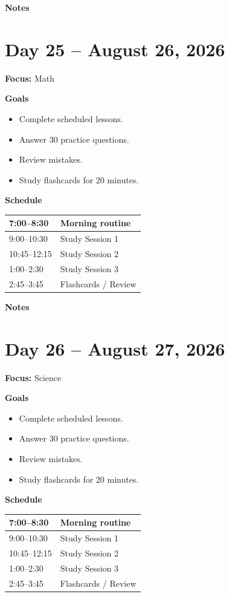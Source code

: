 \vspace{1em}
\textbf{Notes}

\vspace{8cm}

\newpage

\section*{Day 25 -- August 26, 2026}
\textbf{Focus:} Math

\textbf{Goals}
\begin{itemize}
\item Complete scheduled lessons.
\item Answer 30 practice questions.
\item Review mistakes.
\item Study flashcards for 20 minutes.
\end{itemize}

\textbf{Schedule}
\begin{tabular}{|p{4cm}|p{10cm}|}\hline
7:00--8:30 & Morning routine \\\hline
9:00--10:30 & Study Session 1 \\\hline
10:45--12:15 & Study Session 2 \\\hline
1:00--2:30 & Study Session 3 \\\hline
2:45--3:45 & Flashcards / Review \\\hline
\end{tabular}

\vspace{1em}
\textbf{Notes}

\vspace{8cm}

\newpage

\section*{Day 26 -- August 27, 2026}
\textbf{Focus:} Science

\textbf{Goals}
\begin{itemize}
\item Complete scheduled lessons.
\item Answer 30 practice questions.
\item Review mistakes.
\item Study flashcards for 20 minutes.
\end{itemize}

\textbf{Schedule}
\begin{tabular}{|p{4cm}|p{10cm}|}\hline
7:00--8:30 & Morning routine \\\hline
9:00--10:30 & Study Session 1 \\\hline
10:45--12:15 & Study Session 2 \\\hline
1:00--2:30 & Study Session 3 \\\hline
2:45--3:45 & Flashcards / Review \\\hline
\end{tabular}

